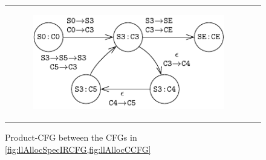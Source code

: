 \begin{figure}[H]
\begin{tabular}{cc}
\begin{subfigure}[b]{1\textwidth}
\begin{center}
{\includegraphics[scale=1.2]{chapters/figures/figMallocProductCfg.pdf}}
\end{center}
\end{subfigure}%
\end{tabular}
\caption{\label{fig:llAllocProductCFG}Product-CFG between the CFGs in \cref{fig:llAllocSpecIRCFG,fig:llAllocCCFG}}
\end{figure}
